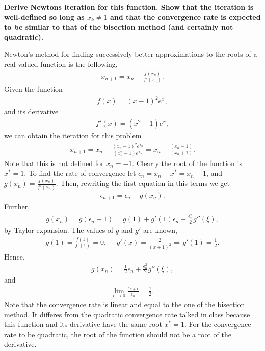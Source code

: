 \textbf{Derive Newtons iteration for this function. Show that the iteration is well-defined so long as $x_k\neq 1$ and that the convergence rate is expected to be similar to that of the bisection method (and certainly not quadratic).}

\vspace{0.3in}
Newton's method for finding successively better approximations to the roots of a real-valued function is the following,
\begin{align*}
x_{n+1}=x_n-\frac{f(x_n)}{f'(x_n)}.
\end{align*}
Given the function
\begin{align*}
f(x)=(x-1)^2e^x,
\end{align*}
and its derivative
\begin{align*}
f'(x)=(x^2-1)e^x,
\end{align*}
we can obtain the iteration for this problem
\begin{align*}
x_{n+1}=x_n-\frac{(x_n-1)^2e^{x_n}}{(x_n^2-1)e^{x_n}}=x_n-\frac{(x_n-1)}{(x_n+1)}.
\end{align*}
Note that this is not defined for $x_n=-1$. Clearly the root of the function is $x^*=1$. To find the rate of convergence let $\epsilon_n=x_n-x^*=x_n-1$, and $g(x_n)=\frac{f(x_n)}{f'(x_n)}$. Then, rewriting the first equation in this terms we get
\begin{align*}
\epsilon_{n+1}=\epsilon_n-g(x_n).
\end{align*}
Further, 
\begin{align*}
g(x_n)=g(\epsilon_n+1)=g(1)+g'(1)\epsilon_n+\frac{\epsilon_n^2}{2}g''(\xi),
\end{align*}
by Taylor expansion. The values of $g$ and $g'$ are known,
\begin{align*}
g(1)=\frac{f(1)}{f'(1)}=0,~~~~~~g'(x)=\frac{2}{(x+1)^2}\Rightarrow g'(1)=\frac{1}{2}.
\end{align*}
Hence,
\begin{align*}
g(x_n)=\frac{1}{2}\epsilon_n+\frac{\epsilon_n^2}{2}g''(\xi),
\end{align*}
and 
\begin{align*}
\lim_{\epsilon\to 0}\frac{\epsilon_{n+1}}{\epsilon_{n}}=\frac{1}{2}.
\end{align*}
Note that the convergence rate is linear and equal to the one of the bisection method. It differes from the quadratic convergence rate talked in class because this function and its derivative have the same root $x^*=1$. For the convergence rate to be quadratic, the root of the function should not be a root of the derivative.

